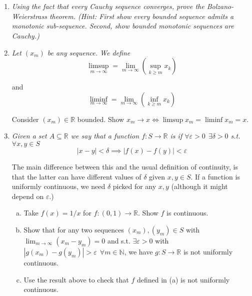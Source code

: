 \documentclass{article}
\begin{document}
\displayoptions

\section{}

\begin{enumerate}[1.]
  \item \textit{Using the fact that every Cauchy sequence converges, prove the Bolzano-Weierstrass theorem. (Hint: First show every bounded sequence admits a monotonic sub-sequence. Second, show bounded monotonic sequences are Cauchy.)}

  \item {\itshape
    Let $(x_m)$ be any sequence. We define
    \[
      \limsup_{m \to \infty} = \lim_{m \to \infty} \left(\sup_{k \ge m} x_k\right)
    \]

    and
    \[
      \liminf_{m \to \infty} = \lim_{m \to \infty} \left(\inf_{k \ge m} x_k\right)
    \]

    Consider $(x_m) \in \mathbb{R}$ bounded. Show $x_m \to x \iff \limsup x_m = \liminf x_m = x$.}

  \item {\itshape
    Given a set $A \subseteq \mathbb{R}$ we say that a function $f: S \to \mathbb{R}$ is  if $\forall \varepsilon > 0 ~~ \exists \delta > 0$ s.t. $\forall x, y \in S$
    \[
      |x - y| < \delta \implies |f(x) - f(y)| < \varepsilon
    \]

    The main difference between this and the usual definition of continuity, is that the latter can have different values of $\delta$ given $x, y \in S$. If a function is uniformly continuous, we need $\delta$ picked for any $x, y$ (although it might depend on $\varepsilon$.)
    \begin{enumerate}[a)]
      \item Take $f(x) = 1 / x$ for $f: (0, 1) \to \mathbb{R}$. Show $f$ is continuous.

      \item Show that for any two sequences $(x_m), (y_m) \in S$ with $\lim_{m \to \infty} (x_m - y_m) = 0$ and s.t. $\exists \varepsilon > 0$ with $|g(x_m) - g(y_m)| > \varepsilon ~~ \forall m \in \mathbb{N}$, we have $g: S \to \mathbb{R}$ is not uniformly continuous.

      \item Use the result above to check that $f$ defined in (a) is not uniformly continuous.


\end{enumerate}}
\end{enumerate}
\end{document}
